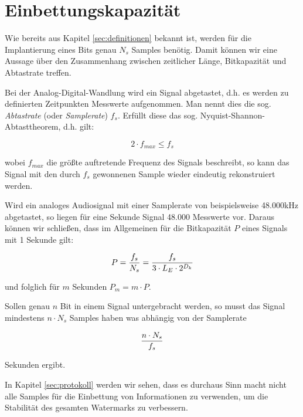 \section{Einbettungskapazit\"at}

Wie bereits aus Kapitel \ref{sec:definitionen} bekannt ist, werden für die Implantierung eines Bits genau $N_s$ Samples benötig. Damit können wir eine Aussage über den Zusammenhang zwischen zeitlicher Länge, Bitkapazität und Abtastrate treffen. 

Bei der Analog-Digital-Wandlung wird ein Signal abgetastet, d.h. es werden zu definierten Zeitpunkten Messwerte aufgenommen. Man nennt dies die sog. \textit{Abtastrate} (oder \textit{Samplerate}) $f_s$. Erfüllt diese das sog. Nyquist-Shannon-Abtasttheorem\cite{shannon1949communication}, d.h. gilt: 

	 \begin{equation}
		 2 \cdot f_{max} \leq f_s
	 	\label{equ:abtasttheorem}
	 \end{equation}
	
wobei ${f}_{max}$ die größte auftretende Frequenz des Signals beschreibt, so kann das Signal mit den durch $f_s$ gewonnenen Sample wieder eindeutig rekonstruiert werden.

Wird ein analoges Audiosignal mit einer Samplerate von beispielsweise 48.000kHz abgetastet, so liegen für eine Sekunde Signal 48.000 Messwerte vor. Daraus können wir schließen, dass im Allgemeinen für die Bitkapazität $P$ eines Signals mit 1 Sekunde gilt: 

	 \begin{equation}
		 P = { {f}_{s} \over N_s } = { {f}_{s} \over 3 \cdot {L}_{E} \cdot 2 ^ {{D}_{k}} }
	 	\label{equ:bitcapacity_1sec}
	 \end{equation}

und folglich für $m$ Sekunden ${P}_{m} = m \cdot P$. 

Sollen genau $n$ Bit in einem Signal untergebracht werden, so musst das Signal mindestens $n \cdot {N}_{s}$ Samples haben was abhängig von der Samplerate

	 \begin{equation}
		 { n \cdot {N}_{s} \over {f}_{s} }
	 	\label{equ:bitcapacity_seconds}
	 \end{equation}
	 
Sekunden ergibt. 

In Kapitel \ref{sec:protokoll} werden wir sehen, dass es durchaus Sinn macht nicht alle Samples für die Einbettung von Informationen zu verwenden, um die Stabilität des gesamten Watermarks zu verbessern. 






